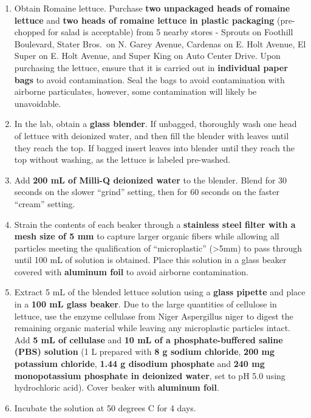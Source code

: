 \documentclass[]{article}
\providecommand{\tightlist}{%
  \setlength{\itemsep}{0pt}\setlength{\parskip}{0pt}}
\begin{document}
\begin{enumerate}
\def\labelenumi{\arabic{enumi}.}
\tightlist
\item
  Obtain Romaine lettuce. Purchase \textbf{two unpackaged heads of
  romaine lettuce} and \textbf{two heads of romaine lettuce in plastic
  packaging} (pre-chopped for salad is acceptable) from 5 nearby stores
  - Sprouts on Foothill Boulevard, Stater Bros.~on N. Garey Avenue,
  Cardenas on E. Holt Avenue, El Super on E. Holt Avenue, and Super King
  on Auto Center Drive. Upon purchasing the lettuce, ensure that it is
  carried out in \textbf{individual paper bags} to avoid contamination.
  Seal the bags to avoid contamination with airborne particulates,
  however, some contamination will likely be unavoidable.~
\item
  In the lab, obtain a \textbf{glass blender}. If unbagged, thoroughly
  wash one head of lettuce with deionized water, and then fill the
  blender with leaves until they reach the top. If bagged insert leaves
  into blender until they reach the top without washing, as the lettuce
  is labeled pre-washed.~
\item
  Add \textbf{200 mL of Milli-Q deionized water} to the blender. Blend
  for 30 seconds on the slower ``grind'' setting, then for 60 seconds on
  the faster ``cream'' setting.~
\item
  Strain the contents of each beaker through a \textbf{stainless steel
  filter with a mesh size of 5 mm} to capture larger organic fibers
  while allowing all particles meeting the qualification of
  ``microplastic'' (\textgreater{}5mm) to pass through until 100 mL of
  solution is obtained. Place this solution in a glass beaker covered
  with \textbf{aluminum foil} to avoid airborne contamination.~
\item
  Extract 5 mL of the blended lettuce solution using a \textbf{glass
  pipette} and place in a \textbf{100 mL glass beaker}. Due to the large
  quantities of cellulose in lettuce, use the enzyme cellulase from
  Niger Aspergillus niger to digest the remaining organic material while
  leaving any microplastic particles intact. Add \textbf{5 mL of
  cellulase} and \textbf{10 mL of a phosphate-buffered saline (PBS)
  solution} (1 L prepared with \textbf{8 g sodium chloride}, \textbf{200
  mg potassium chloride}, \textbf{1.44 g disodium phosphate} and
  \textbf{240 mg monopotassium phosphate in deionized water}, set to pH
  5.0 using hydrochloric acid). Cover beaker with \textbf{aluminum
  foil}.~
\item
  Incubate the solution at 50 degrees C for 4 days.~

\end{enumerate}
\end{document}
